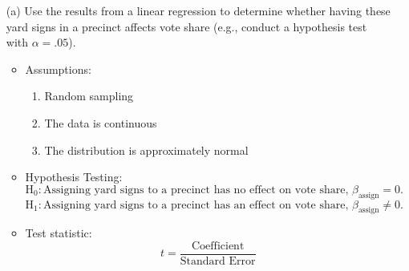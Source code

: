 \documentclass[12pt,letterpaper]{article}
\begin{document}
\vspace{.5cm}
\begin{enumerate}
	\item [(a)] Use the results from a linear regression to determine whether having these yard signs in a precinct affects vote share (e.g., conduct a hypothesis test with $\alpha = .05$).

	\begin{itemize}
		\item Assumptions:
		\begin{enumerate}
			\item Random sampling
			\item The data is continuous
			\item The distribution is approximately normal
		\end{enumerate}
		
		\item Hypothesis Testing:
		\[
		\text{H}_0: \text{Assigning yard signs to a precinct has no effect on vote share, } \beta_{\text{assign}} = 0.
		\]
		\[
		\text{H}_1: \text{Assigning yard signs to a precinct has an effect on vote share, } \beta_{\text{assign}} \neq 0.
		\]
		
		\item Test statistic:
		\[
		t = \frac{\text{Coefficient}}{\text{Standard Error}}
		\]
	\end{itemize}
	

\end{enumerate}
\end{document}
